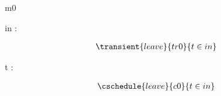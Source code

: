 \documentclass[12pt]{amsart}
\title{}
\author{}
\date{} %
\begin{document}
\maketitle
\tableofcontents


\begin{machine}{m0}


%
	\begin{variable}
		in : \set[\TRAIN]
	\end{variable}
%

\begin{use:set}{\TRAIN} \end{use:set}

\begin{align*}
\transient{leave}{tr0}
{	t \in in	}
\end{align*}

\begin{dummy}
	t : \TRAIN
\end{dummy}

\begin{align*}
\cschedule{leave}{c0}
{	t \in in	}
\end{align*}

\end{machine}
\end{document}

